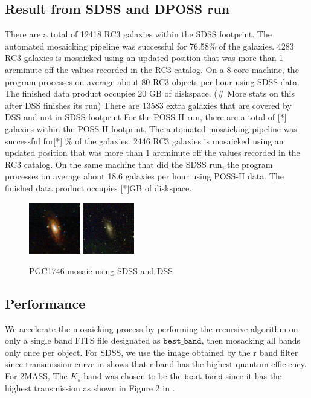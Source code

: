 \documentclass[authoryear, 12pt,5p, times]{elsarticle}
\begin{document}
\subsection{Result from SDSS and DPOSS run}
\indent There are a total of 12418 RC3 galaxies within the SDSS footprint. The automated mosaicking pipeline was successful for 76.58\% of the galaxies. 4283 RC3 galaxies is mosaicked using an updated position that was more than 1 arcminute off the values recorded in the RC3 catalog.  On a 8-core machine, the program processes on average about 80 RC3 objects per hour using SDSS data.  The finished data product occupies 20 GB of diskspace. 
\indent  (\# More stats on this after DSS finishes its run) There are 13583 extra galaxies that are covered by DSS and not in SDSS footprint 
 For the POSS-II run, there are a total of [*] galaxies within the POSS-II footprint.
 The automated mosaicking pipeline was  successful for[*] \% of the galaxies. 2446 RC3 galaxies is mosaicked using an updated position that was more than 1 arcminute off the values recorded in the RC3 catalog. On the same machine that did the SDSS run, the program processes on average about 18.6 galaxies per hour using POSS-II data.  The finished data product occupies [*]GB of diskspace. 
\begin{figure}[h]
 \centering
	\includegraphics[width=0.2\textwidth]{figures/SDSS_1154_BEST}
	\includegraphics[width=0.2\textwidth]{figures/DSS_1154_BEST}	
	\caption{PGC1746 mosaic using SDSS and DSS}
	\label{sdss_dss_comp}
\end{figure}

\subsection{Performance}	

We accelerate the mosaicking process by performing the recursive algorithm on only a single band FITS file designated as $\texttt{best\_band}$, then mosacking all bands only once per object. For SDSS, we use the image obtained by the r band filter since transmission curve in \citealp{edr} shows that r band has the highest quantum efficiency. For 2MASS, The $K_s$ band was chosen to be the $\texttt{best\_band}$ since it has the highest transmission as shown  in Figure 2 in \citealp{2mass}.
\end{document}
